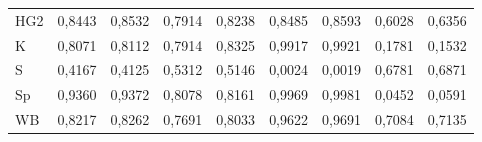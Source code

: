 \begin{table*}
\begin{center}
\begin{tabular}{|l|l|l|l|l|l|l|l|l|}
\hspace*{4mm}HG2&0,8443&0,8532&0,7914&0,8238&0,8485&0,8593&0,6028&0,6356\\
\hspace*{4mm}K&0,8071&0,8112&0,7914&0,8325&0,9917&0,9921&0,1781&0,1532\\
\hspace*{4mm}S&0,4167&0,4125&0,5312&0,5146&0,0024&0,0019&0,6781&0,6871\\
\hspace*{4mm}Sp&0,9360&0,9372&0,8078&0,8161&0,9969&0,9981&0,0452&0,0591\\
\hspace*{4mm}WB&0,8217&0,8262&0,7691&0,8033&0,9622&0,9691&0,7084&0,7135\\
\hline
\end{tabular}
\end{center}
\vspace*{-12pt}
\end{table*}





